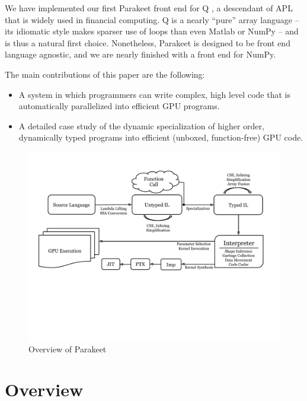\documentclass[preprint]{sigplanconf}
\begin{document}
We have implemented our first Parakeet front end for Q \cite{Borr08}, a descendant of APL that is widely used in financial computing. Q is a nearly ``pure'' array language -- its idiomatic style makes sparser use of loops than even Matlab or NumPy -- and is thus a natural first choice. Nonetheless, Parakeet is designed to be front end language agnostic, and we are nearly finished with a front end for NumPy.

The main contributions of this paper are the following:

\begin{itemize}
\item A system in which programmers can write complex, high level code that is automatically parallelized into efficient GPU programs.

\item A detailed case study of the dynamic specialization of higher order, dynamically typed programs into efficient (unboxed, function-free) GPU code.
\end{itemize}

\begin{figure}[t!bh]
\begin{center}
\leavevmode
\includegraphics[scale=0.6, trim=10pt 180pt 10pt 120pt]{Pipeline.pdf}
\end{center}
\caption{Overview of Parakeet}
\label{fig:overview}
\end{figure}
\section{Overview}
\label{overview}
\end{document}
